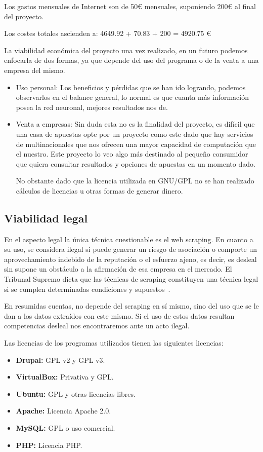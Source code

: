 Los gastos mensuales de Internet son de 50\euro{} mensuales, suponiendo 200\euro{} al final del proyecto.

Los costes totales ascienden a:
4649.92 + 70.83 + 200 = 4920.75 \euro{}

La viabilidad económica del proyecto una vez realizado, en un futuro podemos enfocarla de dos formas, ya que depende del uso del programa o de la venta a una empresa del mismo.

\begin{itemize}
\item Uso personal: Los beneficios y pérdidas que se han ido logrando, podemos observarlos en el balance general, lo normal es que cuanta más información posea la red neuronal, mejores resultados nos de.

\item Venta a empresas: Sin duda esta no es la finalidad del proyecto, es difícil que una casa de apuestas opte por un proyecto como este dado que hay servicios de multinacionales que nos ofrecen una mayor capacidad de computación que el nuestro. Este proyecto lo veo algo más destinado al pequeño consumidor que quiera consultar resultados y opciones de apuestas en un momento dado.

No obstante dado que la licencia utilizada en GNU/GPL no se han realizado cálculos de licencias u otras formas de generar dinero.
\end{itemize}

\subsection{Viabilidad legal}
En el aspecto legal la única técnica cuestionable es el web scraping. En cuanto a su uso, se considera ilegal si puede generar un riesgo de asociación o comporte un aprovechamiento indebido de la reputación o el esfuerzo ajeno, es decir, es desleal sin supone un obstáculo a la afirmación de esa empresa en el mercado. El Tribunal Supremo dicta que las técnicas de scraping constituyen una técnica legal si se cumplen determinadas condiciones y supuestos~\cite{scraping_legal}.

En resumidas cuentas, no depende del scraping en sí mismo, sino del uso que se le dan a los datos extraídos con este mismo. Si el uso de estos datos resultan competencias desleal nos encontraremos ante un acto ilegal.

Las licencias de los programas utilizados tienen las siguientes licencias:
\begin{itemize}
\item \textbf{Drupal: } GPL v2 y GPL v3.
\item \textbf{VirtualBox: } Privativa y GPL.
\item \textbf{Ubuntu: } GPL y otras licencias libres.
\item \textbf{Apache: } Licencia Apache 2.0.
\item \textbf{MySQL: } GPL o uso comercial.
\item \textbf{PHP: } Licencia PHP.
\end{itemize}

